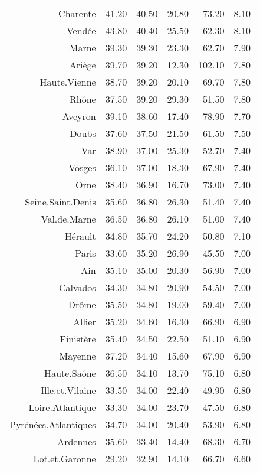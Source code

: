 \documentclass[11pt,a4paper]{article}\usepackage[]{graphicx}\usepackage[]{color}
\begin{document}
\begin{table}[H]
\begin{tabular}{rrrrrr}
  Charente & 41.20 & 40.50 & 20.80 & 73.20 & 8.10 \\ 
  Vendée & 43.80 & 40.40 & 25.50 & 62.30 & 8.10 \\ 
  Marne & 39.30 & 39.30 & 23.30 & 62.70 & 7.90 \\ 
  Ariège & 39.70 & 39.20 & 12.30 & 102.10 & 7.80 \\ 
  Haute.Vienne & 38.70 & 39.20 & 20.10 & 69.70 & 7.80 \\ 
  Rhône & 37.50 & 39.20 & 29.30 & 51.50 & 7.80 \\ 
  Aveyron & 39.10 & 38.60 & 17.40 & 78.90 & 7.70 \\ 
  Doubs & 37.60 & 37.50 & 21.50 & 61.50 & 7.50 \\ 
  Var & 38.90 & 37.00 & 25.30 & 52.70 & 7.40 \\ 
  Vosges & 36.10 & 37.00 & 18.30 & 67.90 & 7.40 \\ 
  Orne & 38.40 & 36.90 & 16.70 & 73.00 & 7.40 \\ 
  Seine.Saint.Denis & 35.60 & 36.80 & 26.30 & 51.40 & 7.40 \\ 
  Val.de.Marne & 36.50 & 36.80 & 26.10 & 51.00 & 7.40 \\ 
  Hérault & 34.80 & 35.70 & 24.20 & 50.80 & 7.10 \\ 
  Paris & 33.60 & 35.20 & 26.90 & 45.50 & 7.00 \\ 
  Ain & 35.10 & 35.00 & 20.30 & 56.90 & 7.00 \\ 
  Calvados & 34.30 & 34.80 & 20.90 & 54.50 & 7.00 \\ 
  Drôme & 35.50 & 34.80 & 19.00 & 59.40 & 7.00 \\ 
  Allier & 35.20 & 34.60 & 16.30 & 66.90 & 6.90 \\ 
  Finistère & 35.40 & 34.50 & 22.50 & 51.10 & 6.90 \\ 
  Mayenne & 37.20 & 34.40 & 15.60 & 67.90 & 6.90 \\ 
  Haute.Saône & 36.50 & 34.10 & 13.70 & 75.10 & 6.80 \\ 
  Ille.et.Vilaine & 33.50 & 34.00 & 22.40 & 49.90 & 6.80 \\ 
  Loire.Atlantique & 33.30 & 34.00 & 23.70 & 47.50 & 6.80 \\ 
  Pyrénées.Atlantiques & 34.70 & 34.00 & 20.40 & 53.90 & 6.80 \\ 
  Ardennes & 35.60 & 33.40 & 14.40 & 68.30 & 6.70 \\ 
  Lot.et.Garonne & 29.20 & 32.90 & 14.10 & 66.70 & 6.60 \\ 
   \hline
\end{tabular}
\end{table}
\end{document}
